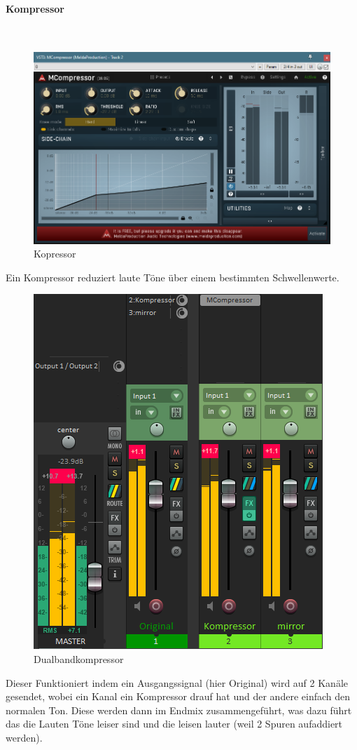 \newpage

\paragraph{Kompressor}~
\begin{figure}[h]
    \centering
    \includegraphics[width=0.5\linewidth]{Bilder/Medientechnik/Kompressor.png}
    \caption{Kopressor}
    \label{fig:enter-label}
\end{figure}

Ein Kompressor reduziert laute Töne über einem bestimmten Schwellenwerte.

\begin{figure}[h]
    \centering
    \includegraphics[width=0.5\linewidth]{Bilder/Medientechnik/Dualband-kompressor.png}
    \caption{Dualbandkompressor}
    \label{fig:Dualband-Kompressor}
\end{figure}
Dieser Funktioniert indem ein Ausgangssignal (hier Original) wird auf 2 Kanäle gesendet, wobei ein Kanal ein Kompressor drauf hat und der andere  einfach den normalen Ton.  Diese werden dann im Endmix zusammengeführt, was dazu führt das die Lauten Töne leiser sind und die leisen lauter (weil 2 Spuren aufaddiert werden).